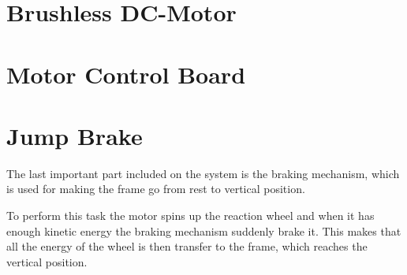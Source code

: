 \section{Brushless DC-Motor}


\section{Motor Control Board}


\section{Jump Brake}
The last important part included on the system is the braking mechanism, which is used for making the frame go from rest to vertical position. 

To perform this task the motor spins up the reaction wheel and when it has enough kinetic energy the braking mechanism suddenly brake it. This makes that all the energy of the wheel is then transfer to the frame, which reaches the vertical position.
